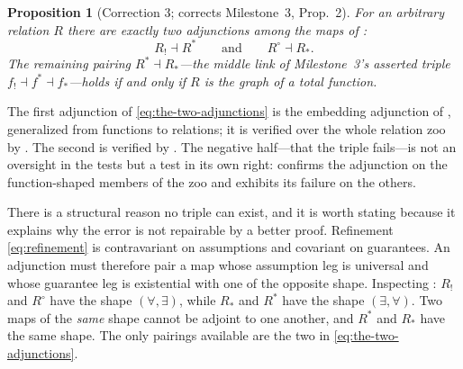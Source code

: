 \documentclass[11pt]{article}
\newif\ifshowcomments
\newtheorem{proposition}{Proposition}
\theoremstyle{definition}
\theoremstyle{remark}
\newcommand{\prompt}[1]{%
    \ifshowcomments
        ~\todo[inline, color=techgold!80, textcolor=black,caption={Task}]{{\bf Prompt:} #1}%
    \fi
}
\newcommand{\ai}[1]{%
    \ifshowcomments
        \noindent\textcolor{techred}{[AI Agent]: #1}%
    \fi
}
\begin{document}
\prompt{Ensure restriction maps have adjoints, facilitating the sheaf Laplacian by reversing
information flow, critical for distributed computation. Deliverable: Adjoint proofs, supporting
Milestone 2's global section proof.}

\begin{proposition}[Correction 3; corrects Milestone~3, Prop.~2]
\label{prop:two-adjunctions}
For an arbitrary relation $R$ there are exactly two adjunctions among the maps of
:
\begin{equation}
\label{eq:the-two-adjunctions}
R_! \dashv R^{*}
\qquad\text{and}\qquad
R^{\circ} \dashv R_*.
\end{equation}
The remaining pairing $R^{*} \dashv R_*$---the middle link of Milestone~3's asserted triple
$f_! \dashv f^* \dashv f_*$---holds \emph{if and only if} $R$ is the graph of a total function.
\end{proposition}

The first adjunction of \eqref{eq:the-two-adjunctions} is the embedding adjunction of
\citet{naikContractEmbeddingsLayered2025}, generalized from functions to relations; it is
verified over the whole relation zoo by
.
The second is verified by .
The negative half---that the triple fails---is not an oversight in the tests but a test in its
own right:  confirms the
adjunction on the function-shaped members of the zoo and exhibits its failure on the others.

\ai{\textbf{Correction 3, the principal one.} Milestone~3 \S2.3, Proposition~2 claims the
adjoint triple $f_! \dashv f^* \dashv f_*$ for a general map of behavior sets, and a margin
exchange in that report explicitly reaffirms it (``What about the $f^\ast \dashv f_\ast$
adjunction?'' --- ``Both adjunctions are stated \dots{} together they form the adjoint
triple''). That reaffirmation is wrong. The triple requires $f$ to be a total function, and
under that hypothesis Milestone~3's statement is recoverable in full; see
\Cref{rem:ms3-recovered}. It fails for the relations the delivered implementation supports, and
the failure is not benign---\S\ref{sec:sheaves} shows that two of the four contract sheaves
tabulated in Milestone~3 were derived from it and are wrong as printed.}

There is a structural reason no triple can exist, and it is worth stating because it explains
why the error is not repairable by a better proof.
Refinement \eqref{eq:refinement} is contravariant on assumptions and covariant on guarantees.
An adjunction must therefore pair a map whose assumption leg is universal and whose guarantee
leg is existential with one of the opposite shape.
Inspecting : $R_!$ and $R^{\circ}$ have the shape
$(\forall, \exists)$, while $R_*$ and $R^{*}$ have the shape $(\exists, \forall)$.
Two maps of the \emph{same} shape cannot be adjoint to one another, and $R^{*}$ and $R_*$ have
the same shape.
The only pairings available are the two in \eqref{eq:the-two-adjunctions}.
\end{document}
